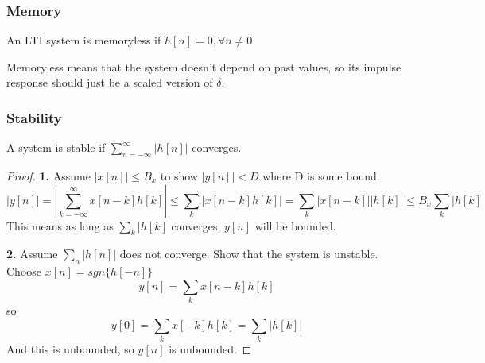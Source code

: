 \subsubsection{Memory}
\begin{theorem}
    An LTI system is memoryless if $h[n]=0, \forall n \ne 0$
\end{theorem}
Memoryless means that the system doesn't depend on past values, so its impulse response should
just be a scaled version of $\delta$.
\subsubsection{Stability}
\begin{theorem}
    A system is stable if $\sum_{n=-\infty}^{\infty}{|h[n]|}$ converges.
\end{theorem}
\begin{proof}
    \textbf{1. } Assume $|x[n]| \le B_x$ to show $|y[n]| < D$ where D is some bound.
    \[
|y[n]| = |\sum_{k=-\infty}^{\infty}{x[n-k]h[k]}| \le \sum_{k}{|x[n-k]h[k]|} = \sum_{k}{|x[n-k]||h[k]|}\le B_x\sum_{k}{|h[k]}
\]
    This means as long as $\sum_{k}{|h[k]}$ converges, $y[n]$ will be bounded.

    \textbf{2. } Assume $\sum_{n}{|h[n]|}$ does not converge. Show that the system is unstable.
    Choose $x[n]=sgn\{h[-n]\}$
    \[
y[n]=\sum_{k}{x[n-k]h[k]}
\] so 
    \[
y[0] = \sum_{k}{x[-k]h[k]} = \sum_{k}{|h[k]|}
\]
    And this is unbounded, so $y[n]$ is unbounded.
\end{proof}
